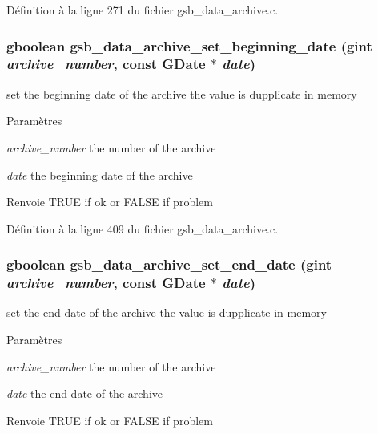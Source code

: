 Définition à la ligne 271 du fichier gsb\_\-data\_\-archive.c.

\subsubsection[{gsb\_\-data\_\-archive\_\-set\_\-beginning\_\-date}]{\setlength{\rightskip}{0pt plus 5cm}gboolean gsb\_\-data\_\-archive\_\-set\_\-beginning\_\-date (gint {\em archive\_\-number}, \/  const GDate $\ast$ {\em date})}\label{gsb__data__archive_8c_ad79c38199834ae790c8534d7addc6b9c}
set the beginning date of the archive the value is dupplicate in memory


\begin{DoxyParams}{Paramètres}
\item[{\em archive\_\-number}]the number of the archive \item[{\em date}]the beginning date of the archive\end{DoxyParams}
\begin{DoxyReturn}{Renvoie}
TRUE if ok or FALSE if problem 
\end{DoxyReturn}


Définition à la ligne 409 du fichier gsb\_\-data\_\-archive.c.

\subsubsection[{gsb\_\-data\_\-archive\_\-set\_\-end\_\-date}]{\setlength{\rightskip}{0pt plus 5cm}gboolean gsb\_\-data\_\-archive\_\-set\_\-end\_\-date (gint {\em archive\_\-number}, \/  const GDate $\ast$ {\em date})}\label{gsb__data__archive_8c_a3a502c684a99f9d9d431c7a7a1ba8ce2}
set the end date of the archive the value is dupplicate in memory


\begin{DoxyParams}{Paramètres}
\item[{\em archive\_\-number}]the number of the archive \item[{\em date}]the end date of the archive\end{DoxyParams}
\begin{DoxyReturn}{Renvoie}
TRUE if ok or FALSE if problem 
\end{DoxyReturn}


